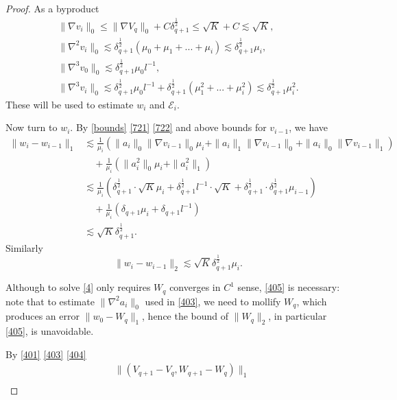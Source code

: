 \documentclass[10pt,a4paper]{amsart}
\newcommand{\E}{\mathcal{E}}
\begin{document}
\begin{proof}
As a byproduct
\begin{gather*}
    \|\nabla v_i\|_0\le \|\nabla V_q\|_0+C\delta_{q+1}^\frac{1}{2}\le \sqrt{K}+C\lesssim\sqrt{K},\\
    \|\nabla^2 v_i\|_0\lesssim \delta_{q+1}^\frac{1}{2}(\mu_0+\mu_1+...+\mu_i)\lesssim\delta_{q+1}^\frac{1}{2}\mu_i,\\
    \|\nabla^3 v_0\|_0\lesssim \delta_{q+1}^\frac{1}{2}\mu_0 l^{-1},\\
    \|\nabla^3 v_i\|_0\lesssim \delta_{q+1}^\frac{1}{2}\mu_0 l^{-1}+\delta_{q+1}^\frac{1}{2}(\mu_1^2+...+\mu_i^2)\lesssim \delta_{q+1}^\frac{1}{2}\mu_i^2.
\end{gather*}
These will be used to estimate $w_i$ and $\E_i$.

Now turn to $w_i$. By \eqref{bounds} \eqref{721} \eqref{722} and above bounds for $v_{i-1}$,  we have
\begin{equation}\label{404}
\begin{aligned}
    \|w_i-w_{i-1}\|_1
    &\lesssim \frac{1}{\mu_i}(\|a_i\|_0\|\nabla v_{i-1}\|_0\mu_i+\|a_i\|_1\|\nabla v_{i-1}\|_0+\|a_i\|_0\|\nabla v_{i-1}\|_1)\\
    &\quad +\frac{1}{\mu_i}(\|a_i^2\|_0\mu_i+\|a_i^2\|_1)\\
    &\lesssim  \frac{1}{\mu_i}(\delta_{q+1}^\frac{1}{2} \cdot\sqrt{K}\mu_i+\delta_{q+1}^\frac{1}{2}l^{-1}\cdot\sqrt{K}+\delta_{q+1}^\frac{1}{2}\cdot \delta_{q+1}^\frac{1}{2}\mu_{i-1})\\
    &\quad +\frac{1}{\mu_i}(\delta_{q+1}\mu_i+\delta_{q+1}l^{-1})\\
    &\lesssim\sqrt{K}\delta_{q+1}^\frac{1}{2}.
\end{aligned}
\end{equation}
Similarly 
\begin{equation}\label{405}
    \|w_i-w_{i-1}\|_2\lesssim \sqrt{K}\delta_{q+1}^\frac{1}{2}\mu_i.
\end{equation}
\begin{rem}\label{rem998}
Although to solve \eqref{4} only requires $W_q$ converges in $C^1$ sense, \eqref{405} is necessary: note that to estimate $\|\nabla^2 a_i\|_0$ used in \eqref{403}, we need to mollify $W_q$, which produces an error $\|w_0-W_q\|_1$, hence the bound of $\|W_q\|_2$, in particular \eqref{405}, is unavoidable. 
\end{rem}
By \eqref{401} \eqref{403} \eqref{404}
\begin{equation}\label{K6}
\begin{aligned}
    &\|(V_{q+1}-V_q, W_{q+1}-W_q)\|_1\\

\end{aligned}
\end{equation}
\end{proof}
\end{document}
